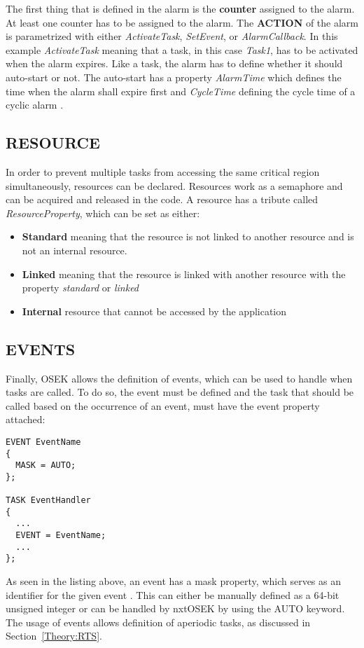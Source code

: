 The first thing that is defined in the alarm is the \textbf{counter} assigned to the alarm.
At least one counter has to be assigned to the alarm.
The \textbf{ACTION} of the alarm is parametrized with either \textit{ActivateTask}, \textit{SetEvent}, or \textit{AlarmCallback}\cite{irisa25}.
In this example \textit{ActivateTask} meaning that a task, in this case \textit{Task1}, has to be activated when the alarm expires. 
Like a task, the alarm has to define whether it should auto-start or not.
The auto-start has a property \textit{AlarmTime} which defines the time when the alarm shall expire first and \textit{CycleTime} defining the cycle time of a cyclic alarm \cite{irisa25}.

\subsection{RESOURCE}
In order to prevent multiple tasks from accessing the same critical region simultaneously, resources can be declared.
Resources work as a semaphore and can be acquired and released in the code.
A resource has a tribute called \textit{ResourceProperty}, which can be set as either:
\begin{itemize}
\item \textbf{Standard} meaning that the resource is not linked to another resource and is not an internal resource.
\item \textbf{Linked} meaning that the resource is linked with another resource with the property \textit{standard} or \textit{linked}
\item \textbf{Internal} resource that cannot be accessed by the application \cite{irisa25}
\end{itemize}

\subsection{EVENTS}
Finally, OSEK allows the definition of events, which can be used to handle when tasks are called.
To do so, the event must be defined and the task that should be called based on the occurrence of an event, must have the event property attached:
\begin{lstlisting}
EVENT EventName
{
  MASK = AUTO;
};

TASK EventHandler
{
  ...
  EVENT = EventName;
  ...
};
\end{lstlisting}
As seen in the listing above, an event has a mask property, which serves as an identifier for the given event \cite{irisa25}.
This can either be manually defined as a 64-bit unsigned integer or can be handled by nxtOSEK by using the AUTO keyword.
The usage of events allows definition of aperiodic tasks, as discussed in Section~\ref{Theory:RTS}.
